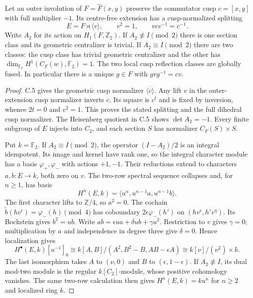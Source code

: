 Let an outer involution of $F=\widehat F(x,y)$ preserve
the commutator cusp $c=[x,y]$ with full multiplier $-1$.
Its centre-free extension has a cusp-normalized splitting
\[
 E=F\rtimes\langle v\rangle,
 \qquad v^2=1,\qquad vcv^{-1}=c^{-1}.
\]
Write $A_2$ for its action on $H_1(F,\mathbb Z_2)$.
If $A_2\not\equiv I\pmod2$ there is one section class
and its geometric centralizer is trivial.  If
$A_2\equiv I\pmod2$ there are two classes: the cusp
class has trivial geometric centralizer and the other
has $\dim_{\mathbb F_2}H^1(C_F(w),\mathbb F_2)=1$.
The two local cusp reflection classes are globally
fused.  In particular there is a unique $g\in F$ with
$gvg^{-1}=cv$.

\begin{proof}
C.5 gives the geometric cusp normalizer
$\overline{\langle c\rangle}$.  Any lift $v$ in
the outer-extension cusp normalizer inverts $c$.
Its square is $c^t$ and is fixed by inversion,
whence $2t=0$ and $v^2=1$.  This proves the stated
splitting and the full dihedral cusp normalizer.
The Heisenberg quotient in C.5 shows
$\det A_2=-1$.  Every finite subgroup of $E$ injects
into $C_2$, and each section $S$ has normalizer
$C_F(S)\times S$.

Put $k=\mathbb F_2$.  If $A_2\equiv I\pmod2$,
the operator $(I-A_2)/2$ is an integral idempotent.
Its image and kernel have rank one, so the integral
character module has a basis $\varphi_+,\varphi_-$
with actions $+1,-1$.  Their reductions extend to
characters $a,b:E\to k$, both zero on $v$.
The two-row spectral sequence collapses and, for
$n\geq1$, has basis
\[
                  H^n(E,k)=\langle u^n,u^{n-1}a,u^{n-1}b\rangle.
\]
The first character lifts to $\mathbb Z/4$, so
$a^2=0$.  The cochain
$\widetilde b(hv^\epsilon)=\varphi_-(h)\pmod4$
has coboundary $2\epsilon\varphi_-(h')$ on
$(hv^\epsilon,h'v^\eta)$.  Its Bockstein gives
$b^2=ub$.  Write $ab=\epsilon ua+\delta ub+
\gamma u^2$.  Restriction to $v$ gives $\gamma=0$;
multiplication by $a$ and independence in degree
three give $\delta=0$.  Hence localization gives
\[
 H^\bullet(E,k)[u^{-1}]_0
 \cong k[A,B]/(A^2,B^2-B,AB-\epsilon A)
 \cong k[\nu]/(\nu^2)\times k.                              \tag{C.8.1}
\]
The last isomorphism takes $A$ to $(\nu,0)$ and
$B$ to $(\epsilon,1-\epsilon)$.
If $A_2\not\equiv I$, its dual mod-two module is
the regular $k[C_2]$-module, whose positive
cohomology vanishes.  The same two-row calculation
then gives $H^n(E,k)=ku^n$ for $n\geq2$ and
localized ring $k$.


\end{proof}
